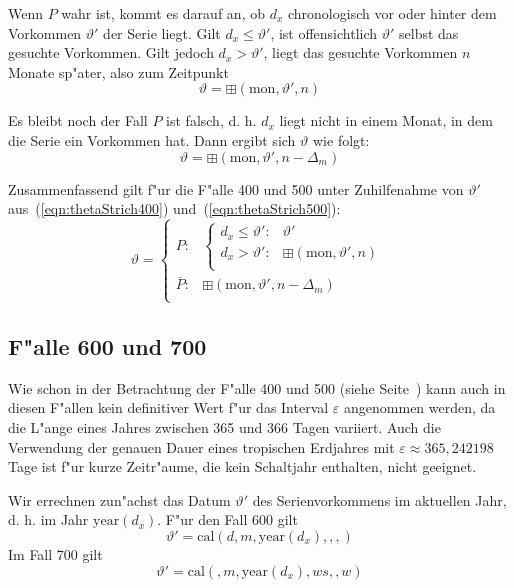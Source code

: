\documentclass[a4paper]{article}
\newcommand*{\monf}{\mathrm{mon}}
\newcommand*{\yearf}{\mathrm{year}}
\newcommand*{\calf}{\mathrm{cal}}
\newcommand*{\addff}{\boxplus}
\numberwithin{equation}{section}
\begin{document}
Wenn $P$ wahr ist, kommt es darauf an, ob $d_x$ chronologisch vor oder hinter
dem Vorkommen $\vartheta'$ der Serie liegt. Gilt $d_x \le \vartheta'$, ist
offensichtlich $\vartheta'$ selbst das gesuchte Vorkommen. Gilt jedoch
$d_x > \vartheta'$, liegt das gesuchte Vorkommen $n$ Monate sp"ater, also zum
Zeitpunkt
\begin{equation*}\vartheta = \addff(\monf, \vartheta', n)\end{equation*}

Es bleibt noch der Fall $P$ ist falsch, d. h. $d_x$ liegt nicht in einem Monat,
in dem die Serie ein Vorkommen hat.
Dann ergibt sich $\vartheta$ wie folgt:
\begin{equation}\vartheta = \addff(\monf, \vartheta', n-\Delta_m)\end{equation}

\noindent Zusammenfassend gilt f"ur die F"alle 400 und 500 unter Zuhilfenahme
von $\vartheta'$ aus~(\ref{eqn:thetaStrich400}) und~(\ref{eqn:thetaStrich500}):
\begin{equation}\label{eqn:theta400}
  \vartheta = \left\{\begin{array}{ll}
  P : & \left\{\begin{array}{ll}
    d_x \le \vartheta' : & \vartheta' \\
    d_x > \vartheta' : & \addff(\monf, \vartheta', n) \\
    \end{array}\right. \\
  \overline{P} : & \addff(\monf, \vartheta', n-\Delta_m) \\
  \end{array}\right.
\end{equation}


%
%
\subsection{F"alle 600 und 700}
Wie schon in der Betrachtung der F"alle 400 und 500 (siehe
Seite~\pageref{ssec:approx400_500}) kann auch in diesen F"allen kein definitiver
Wert f"ur das Interval $\varepsilon$ angenommen werden, da die L"ange eines
Jahres zwischen 365 und 366 Tagen variiert. Auch die Verwendung der genauen
Dauer eines tropischen Erdjahres mit $\varepsilon \approx 365,242198$ Tage ist
f"ur kurze Zeitr"aume, die kein Schaltjahr enthalten, nicht geeignet.

Wir errechnen zun"achst das Datum $\vartheta'$ des Serienvorkommens im aktuellen
Jahr, d. h. im Jahr $\yearf(d_x)$. F"ur den Fall 600 gilt
\begin{equation}\vartheta' = \calf(d, m, \yearf(d_x), , , )\end{equation}
Im Fall 700 gilt
\begin{equation}\vartheta' = \calf(, m, \yearf(d_x), ws, , w)\end{equation}
\end{document}
